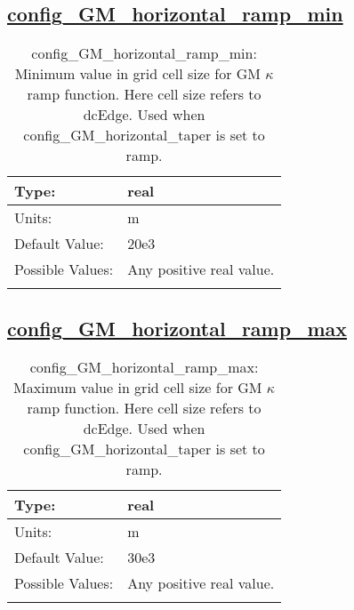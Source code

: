 \subsection[config\_GM\_horizontal\_ramp\_min]{\hyperref[sec:nm_tab_GM_eddy_parameterization]{config\_GM\_horizontal\_ramp\_min}}
\label{subsec:nm_sec_config_GM_horizontal_ramp_min}
\begin{center}
\begin{longtable}{| p{2.0in} || p{4.0in} |}
    \hline
    Type: & real \\
    \hline
    Units: & \si{m} \\
    \hline
    Default Value: & 20e3 \\
    \hline
    Possible Values: & Any positive real value. \\
    \hline
    \caption{config\_GM\_horizontal\_ramp\_min: Minimum value in grid cell size for GM $\kappa$ ramp function.  Here cell size refers to dcEdge. Used when config\_GM\_horizontal\_taper is set to ramp.}
\end{longtable}
\end{center}
\subsection[config\_GM\_horizontal\_ramp\_max]{\hyperref[sec:nm_tab_GM_eddy_parameterization]{config\_GM\_horizontal\_ramp\_max}}
\label{subsec:nm_sec_config_GM_horizontal_ramp_max}
\begin{center}
\begin{longtable}{| p{2.0in} || p{4.0in} |}
    \hline
    Type: & real \\
    \hline
    Units: & \si{m} \\
    \hline
    Default Value: & 30e3 \\
    \hline
    Possible Values: & Any positive real value. \\
    \hline
    \caption{config\_GM\_horizontal\_ramp\_max: Maximum value in grid cell size for GM $\kappa$ ramp function.  Here cell size refers to dcEdge. Used when config\_GM\_horizontal\_taper is set to ramp.}
\end{longtable}
\end{center}
